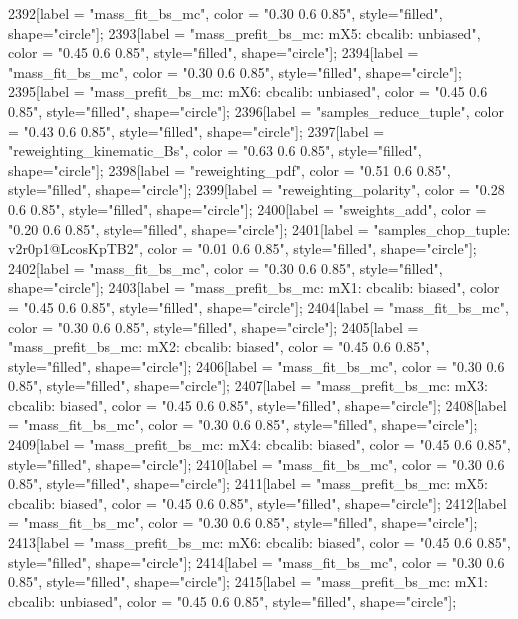 {	2392[label = "mass_fit_bs_mc", color = "0.30 0.6 0.85", style="filled", shape="circle"];
	2393[label = "mass_prefit_bs_mc\nmassbin: mX5\nmassmodel: cbcalib\ntrigger: unbiased", color = "0.45 0.6 0.85", style="filled", shape="circle"];
	2394[label = "mass_fit_bs_mc", color = "0.30 0.6 0.85", style="filled", shape="circle"];
	2395[label = "mass_prefit_bs_mc\nmassbin: mX6\nmassmodel: cbcalib\ntrigger: unbiased", color = "0.45 0.6 0.85", style="filled", shape="circle"];
	2396[label = "samples_reduce_tuple", color = "0.43 0.6 0.85", style="filled", shape="circle"];
	2397[label = "reweighting_kinematic_Bs", color = "0.63 0.6 0.85", style="filled", shape="circle"];
	2398[label = "reweighting_pdf", color = "0.51 0.6 0.85", style="filled", shape="circle"];
	2399[label = "reweighting_polarity", color = "0.28 0.6 0.85", style="filled", shape="circle"];
	2400[label = "sweights_add", color = "0.20 0.6 0.85", style="filled", shape="circle"];
	2401[label = "samples_chop_tuple\nversion: v2r0p1@LcosKpTB2", color = "0.01 0.6 0.85", style="filled", shape="circle"];
	2402[label = "mass_fit_bs_mc", color = "0.30 0.6 0.85", style="filled", shape="circle"];
	2403[label = "mass_prefit_bs_mc\nmassbin: mX1\nmassmodel: cbcalib\ntrigger: biased", color = "0.45 0.6 0.85", style="filled", shape="circle"];
	2404[label = "mass_fit_bs_mc", color = "0.30 0.6 0.85", style="filled", shape="circle"];
	2405[label = "mass_prefit_bs_mc\nmassbin: mX2\nmassmodel: cbcalib\ntrigger: biased", color = "0.45 0.6 0.85", style="filled", shape="circle"];
	2406[label = "mass_fit_bs_mc", color = "0.30 0.6 0.85", style="filled", shape="circle"];
	2407[label = "mass_prefit_bs_mc\nmassbin: mX3\nmassmodel: cbcalib\ntrigger: biased", color = "0.45 0.6 0.85", style="filled", shape="circle"];
	2408[label = "mass_fit_bs_mc", color = "0.30 0.6 0.85", style="filled", shape="circle"];
	2409[label = "mass_prefit_bs_mc\nmassbin: mX4\nmassmodel: cbcalib\ntrigger: biased", color = "0.45 0.6 0.85", style="filled", shape="circle"];
	2410[label = "mass_fit_bs_mc", color = "0.30 0.6 0.85", style="filled", shape="circle"];
	2411[label = "mass_prefit_bs_mc\nmassbin: mX5\nmassmodel: cbcalib\ntrigger: biased", color = "0.45 0.6 0.85", style="filled", shape="circle"];
	2412[label = "mass_fit_bs_mc", color = "0.30 0.6 0.85", style="filled", shape="circle"];
	2413[label = "mass_prefit_bs_mc\nmassbin: mX6\nmassmodel: cbcalib\ntrigger: biased", color = "0.45 0.6 0.85", style="filled", shape="circle"];
	2414[label = "mass_fit_bs_mc", color = "0.30 0.6 0.85", style="filled", shape="circle"];
	2415[label = "mass_prefit_bs_mc\nmassbin: mX1\nmassmodel: cbcalib\ntrigger: unbiased", color = "0.45 0.6 0.85", style="filled", shape="circle"];
}
